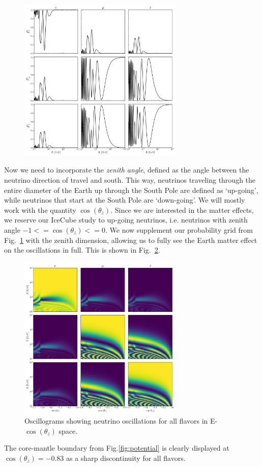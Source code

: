 \begin{figure}
    \centering
    \includegraphics[width=0.7\textwidth]{figures/oscillations.pdf}
    \caption{}\label{fig:oscillations}
\end{figure}

Now we need to incorporate the \emph{zenith angle}, defined as the angle between the neutrino direction of travel and south.
This way, neutrinos traveling through the entire diameter of the Earth up through the South Pole are defined as `up-going', while
neutrinos that start at the South Pole are `down-going'. We will mostly work with the quantity $\cos{(\theta_z)}$.
Since we are interested in the matter effects, we reserve our IceCube study to up-going neutrinos, i.e. neutrinos with
zenith angle $-1<= \cos{(\theta_z)}<=0$. We now supplement our probability grid from Fig.~\ref{fig:oscillations} with the zenith dimension,
allowing us to fully see the Earth matter effect on the oscillations in full. This is shown in Fig.~\ref{fig:oscillograms}.

\begin{figure}
    \centering
    \includegraphics[width=0.7\textwidth]{figures/oscillograms.pdf}
    \caption{Oscillograms showing neutrino oscillations for all flavors in E-$\cos(\theta_z)$ space.}\label{fig:oscillograms}%
\end{figure}%
The core-mantle boundary from Fig.\ref{fig:potential} is clearly displayed at $\cos{(\theta_z)} = -0.83$ as a sharp discontinuity for all flavors. 

% 